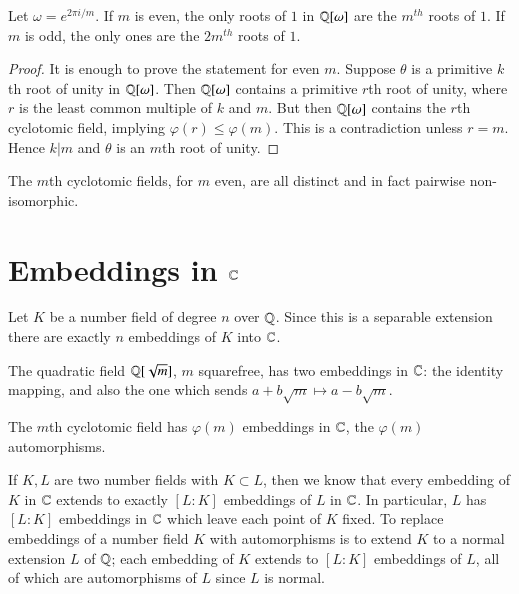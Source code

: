 \begin{cor}
    Let $\omega = e^{2\pi i/m}$. If $m$ is even, the only roots of $1$ in $\mathbb Q[\omega]$ are the $m^{th}$ roots of $1$. If $m$ is odd, the only ones are the $2m^{th}$ roots of $1$.
\end{cor}
\begin{proof}
    It is enough to prove the statement for even $m$. Suppose $\theta$ is a primitive $k$th root of unity in $\mathbb Q[\omega]$. Then $\mathbb Q[\omega]$ contains a primitive $r$th root of unity, where $r$ is the least common multiple of $k$ and $m$. But then $\mathbb Q[\omega]$ contains the $r$th cyclotomic field, implying $\varphi(r) \leq \varphi(m)$. This is a contradiction unless $r = m$. Hence $k\vert m$ and $\theta$ is an $m$th root of unity.
\end{proof}

\begin{cor}
    The $m$th cyclotomic fields, for $m$ even, are all distinct and in fact pairwise non-isomorphic.
\end{cor}



\section{Embeddings in $\mathbb C$}

Let $K$ be a number field of degree $n$ over $\mathbb Q$. Since this is a separable extension there are exactly $n$ embeddings of $K$ into $\mathbb C$.

\begin{eg}
    The quadratic field $\mathbb Q[\sqrt{m}]$, $m$ squarefree, has two embeddings in $\mathbb C$: the identity mapping, and also the one which sends $a+b\sqrt{m}\mapsto a-b\sqrt{m}$. 
\end{eg}

\begin{eg}
    The $m$th cyclotomic field has $\varphi(m)$ embeddings in $\mathbb C$, the $\varphi(m)$ automorphisms.
\end{eg}

If $K, L$ are two number fields with $K \subset L$, then we know that every embedding of $K$ in $\mathbb C$ extends to exactly $[L:K]$ embeddings of $L$ in $\mathbb C$. In particular, $L$ has $[L:K]$ embeddings in $\mathbb C$ which leave each point of $K$ fixed. To replace embeddings of a number field $K$ with automorphisms is to extend $K$ to a normal extension $L$ of $\mathbb Q$; each embedding of $K$ extends to $[L:K]$ embeddings of $L$, all of which are automorphisms of $L$ since $L$ is normal.

